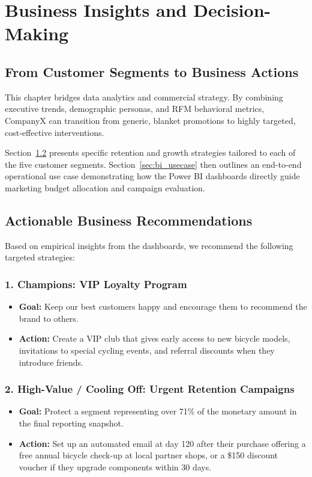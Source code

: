 \chapter{Business Insights and Decision-Making}\label{chap:business_decisions}

\section{From Customer Segments to Business Actions}
This chapter bridges data analytics and commercial strategy. By combining executive trends, demographic personas, and RFM behavioral metrics, CompanyX can transition from generic, blanket promotions to highly targeted, cost-effective interventions.

Section~\ref{sec:bi_recommendations} presents specific retention and growth strategies tailored to each of the five customer segments. Section~\ref{sec:bi_usecase} then outlines an end-to-end operational use case demonstrating how the Power BI dashboards directly guide marketing budget allocation and campaign evaluation.

\section{Actionable Business Recommendations}
\label{sec:bi_recommendations}
Based on empirical insights from the dashboards, we recommend the following targeted strategies:

\subsection{1. Champions: VIP Loyalty Program}
\label{subsec:rec_champions}
\begin{itemize}
    \item \textbf{Goal:} Keep our best customers happy and encourage them to recommend the brand to others.
    \item \textbf{Action:} Create a VIP club that gives early access to new bicycle models, invitations to special cycling events, and referral discounts when they introduce friends.
\end{itemize}

\subsection{2. High-Value / Cooling Off: Urgent Retention Campaigns}
\label{subsec:rec_high_value}
\begin{itemize}
    \item \textbf{Goal:} Protect a segment representing over 71\% of the monetary amount in the final reporting snapshot.
    \item \textbf{Action:} Set up an automated email at day 120 after their purchase offering a free annual bicycle check-up at local partner shops, or a \$150 discount voucher if they upgrade components within 30 days.
\end{itemize}

